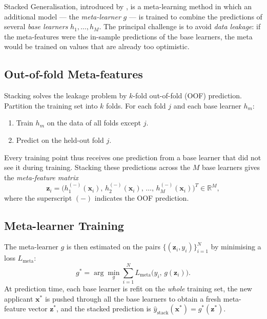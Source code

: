 Stacked Generalisation, introduced by \citet{wolpert1992stacked}, is
a meta-learning method in which an additional model --- the
\emph{meta-learner} $g$ --- is trained to combine the predictions of
several \emph{base learners} $h_1,\ldots,h_M$. The principal
challenge is to avoid \emph{data leakage}: if the meta-features were
the in-sample predictions of the base learners, the meta would be
trained on values that are already too optimistic.

\subsection{Out-of-fold Meta-features}

Stacking solves the leakage problem by $k$-fold out-of-fold (OOF)
prediction. Partition the training set into $k$ folds. For each
fold $j$ and each base learner $h_m$:
\begin{enumerate}
 \item Train $h_m$ on the data of all folds except $j$.
 \item Predict on the held-out fold $j$.
\end{enumerate}
Every training point thus receives one prediction from a base learner
that did not see it during training. Stacking these predictions
across the $M$ base learners gives the \emph{meta-feature matrix}
\begin{equation}
\mathbf{z}_i
=
\bigl(
h_1^{(-)}(\mathbf{x}_i),\,
h_2^{(-)}(\mathbf{x}_i),\,
\ldots,\,
h_M^{(-)}(\mathbf{x}_i)
\bigr)^{T}
\in\mathbb{R}^{M},
\tag{2.11}
\label{eq:meta-features}
\end{equation}
where the superscript $(-)$ indicates the OOF prediction.

\subsection{Meta-learner Training}

The meta-learner $g$ is then estimated on the pairs
$\{(\mathbf{z}_i,y_i)\}_{i=1}^{N}$ by minimising a loss
$L_{\text{meta}}$:
\begin{equation}
g^{*}
=
\arg\min_{g}
\sum_{i=1}^{N}
L_{\text{meta}}\!\bigl(y_i,\,g(\mathbf{z}_i)\bigr).
\tag{2.12}
\label{eq:meta-train}
\end{equation}
At prediction time, each base learner is refit on the \emph{whole}
training set, the new applicant $\mathbf{x}^{*}$ is pushed through
all the base learners to obtain a fresh meta-feature vector
$\mathbf{z}^{*}$, and the stacked prediction is
$\hat y_{\mathrm{stack}}(\mathbf{x}^{*})
= g^{*}(\mathbf{z}^{*})$.

